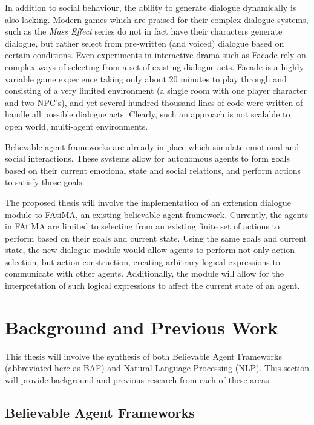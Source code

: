 \documentclass{article}
\begin{document}
In addition to social behaviour, the ability to generate dialogue
dynamically is also lacking.  Modern games which are praised for their
complex dialogue systems, such as the \emph{Mass Effect} series \cite{BioWare2007}
 do not in fact have their characters generate dialogue, but
rather select from pre-written (and voiced) dialogue based on certain
conditions.  Even experiments in interactive drama such as Facade
\cite{Mateasc} rely on complex ways of selecting from a set of existing
dialogue acts.  Facade is a highly variable game experience taking
only about 20 minutes to play through and consisting of a very limited
environment (a single room with one player character and two NPC's), and
yet several hundred thousand lines of code were written of handle all
possible dialogue acts\cite{Mateas}.  Clearly, such an approach is not
scalable to open world, multi-agent environments.

Believable agent frameworks are already in place which simulate
emotional and social interactions.  These systems allow for autonomous
agents to form goals based on their current emotional state and social
relations, and perform actions to satisfy those goals.

The proposed thesis will involve the implementation of an extension dialogue module
to FAtiMA\cite{Mascarenhas}, an existing believable agent framework.
Currently, the agents in FAtiMA are limited to selecting from an
existing finite set of actions to perform based on their goals and
current state.  Using the same goals and current state, the new dialogue
module would allow agents to perform not only action selection, but
action construction, creating arbitrary logical expressions to
communicate with other agents.  Additionally, the module will allow for
the interpretation of such logical expressions to affect the current
state of an agent.

\section{Background and Previous Work}

This thesis will involve the synthesis of both Believable Agent
Frameworks (abbreviated here as BAF) and Natural Language Processing
(NLP).  This section will provide background and previous research
from each of these areas.

\subsection{Believable Agent Frameworks}
\end{document}
